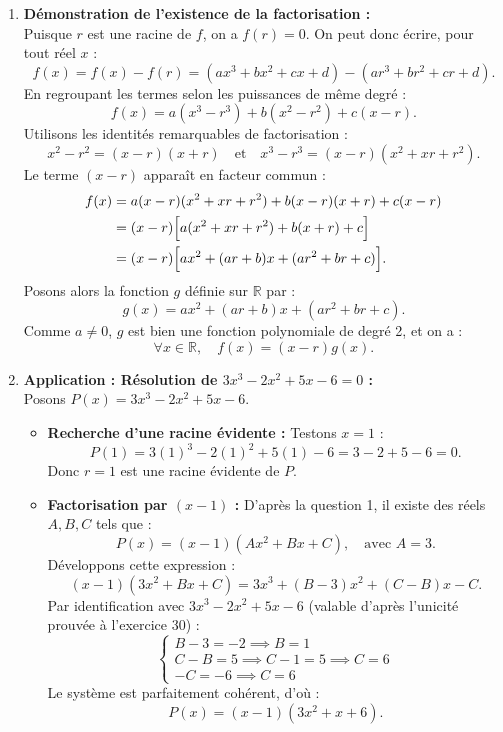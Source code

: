 \documentclass[11pt,a4paper]{article}
\begin{document}
\begin{correctionbox}
\begin{enumerate}
    \item \textbf{Démonstration de l'existence de la factorisation :}\\
    Puisque $r$ est une racine de $f$, on a $f(r) = 0$. On peut donc écrire, pour tout réel $x$ :
    \[
    f(x) = f(x) - f(r) = (ax^3 + bx^2 + cx + d) - (ar^3 + br^2 + cr + d).
    \]
    En regroupant les termes selon les puissances de même degré :
    \[
    f(x) = a(x^3 - r^3) + b(x^2 - r^2) + c(x - r).
    \]
    Utilisons les identités remarquables de factorisation :
    \[
    x^2 - r^2 = (x - r)(x + r) \quad \text{et} \quad x^3 - r^3 = (x - r)(x^2 + xr + r^2).
    \]
    Le terme $(x - r)$ apparaît en facteur commun :
    \[
    \begin{aligned}
    f(x) &= a(x - r)(x^2 + xr + r^2) + b(x - r)(x + r) + c(x - r) \\
    &= (x - r) \Bigl[ a(x^2 + xr + r^2) + b(x + r) + c \Bigr] \\
    &= (x - r) \Bigl[ ax^2 + (ar + b)x + (ar^2 + br + c) \Bigr].
    \end{aligned}
    \]
    Posons alors la fonction $g$ définie sur $\mathbb{R}$ par :
    \[
    g(x) = ax^2 + (ar + b)x + (ar^2 + br + c).
    \]
    Comme $a \ne 0$, $g$ est bien une fonction polynomiale de degré 2, et on a :
    \[
    \forall x \in \mathbb{R}, \quad f(x) = (x - r)g(x).
    \]

    \item \textbf{Application : Résolution de $3x^3 - 2x^2 + 5x - 6 = 0$ :}\\
    Posons $P(x) = 3x^3 - 2x^2 + 5x - 6$.
    \begin{itemize}[leftmargin=*,label=\textbullet]
        \item \textbf{Recherche d'une racine évidente :}
        Testons $x = 1$ :
        \[
        P(1) = 3(1)^3 - 2(1)^2 + 5(1) - 6 = 3 - 2 + 5 - 6 = 0.
        \]
        Donc $r = 1$ est une racine évidente de $P$.

        \item \textbf{Factorisation par $(x - 1)$ :}
        D'après la question 1, il existe des réels $A, B, C$ tels que :
        \[
        P(x) = (x - 1)(Ax^2 + Bx + C), \quad \text{avec } A = 3.
        \]
        Développons cette expression :
        \[
        (x - 1)(3x^2 + Bx + C) = 3x^3 + (B - 3)x^2 + (C - B)x - C.
        \]
        Par identification avec $3x^3 - 2x^2 + 5x - 6$ (valable d'après l'unicité prouvée à l'exercice 30) :
        \[
        \begin{cases}
        B - 3 = -2 \implies B = 1 \\
        C - B = 5 \implies C - 1 = 5 \implies C = 6 \\
        -C = -6 \implies C = 6
        \end{cases}
        \]
        Le système est parfaitement cohérent, d'où :
        \[
        P(x) = (x - 1)(3x^2 + x + 6).
        \]


\end{itemize}
\end{enumerate}
\end{correctionbox}
\end{document}
